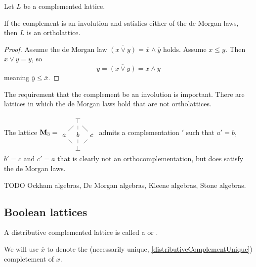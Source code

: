\begin{proposition}
Let $L$ be a complemented lattice.

If the complement is an involution and satisfies either of the de Morgan laws, then $L$ is an ortholattice.
\end{proposition}
\begin{proof}
Assume the de Morgan law $\overline{(x\vee y)} = \overline{x} \wedge \overline{y}$ holds. Assume $x\leq y$. Then $x\vee y = y$, so
\[ \overline{y} = \overline{(x\vee y)} = \overline{x} \wedge \overline{y} \]
meaning $\overline{y} \leq \overline{x}$.
\end{proof}

The requirement that the complement be an involution is important. There are lattices in which the de Morgan laws hold that are not ortholattices.

\begin{example}
The lattice $\mathbf{M}_3 = \begin{tikzcd}[column sep={2em,between origins},row sep={2em,between origins}]
&\top \ar[ld, dash] \ar[d,dash] \ar[rd, dash] &\\ a \ar[rd, dash]& b \ar[d, dash] & c \ar[ld, dash] \\ &\bot &
\end{tikzcd}$ admits a complementation $'$ such that $a' = b$, $b' = c$ and $c' = a$ that is clearly not an orthocomplementation, but does satisfy the de Morgan laws.
\end{example}

TODO Ockham algebras, De Morgan algebras, Kleene algebras, Stone algebras.

\subsection{Boolean lattices}
\begin{definition}
A distributive complemented lattice is called a  or .
\end{definition}
We will use $\overline{x}$ to denote the (necessarily unique, \ref{distributiveComplementUnique}) completement of $x$.

